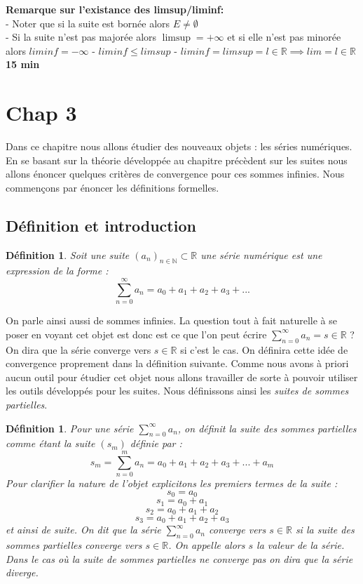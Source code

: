 \documentclass[a4paper, 12pt, french, twoside]{article}
\newtheorem{defi}[theorem]{Définition}
\newcommand{\Nn}{{\mathbb{N}}}
\newcommand{\Rr}{{\mathbb{R}}}
\begin{document}
\textbf{Remarque sur l'existance des limsup/liminf:} \\  
- Noter que si la suite est bornée alors $E \neq \emptyset$ \\ 
- Si la suite n'est pas majorée alors $\limsup = + \infty$ et si elle n'est pas minorée alors $liminf = -\infty$
- $liminf \le limsup$
- $liminf = limsup = l \in \Rr \implies lim = l \in \Rr $
\\

\textbf{15 min}

\section{Chap 3}
Dans ce chapitre nous allons étudier des nouveaux objets : les séries numériques. En se basant sur la théorie développée au chapitre précèdent sur les suites nous allons énoncer quelques critères de convergence pour ces sommes infinies. Nous commençons par énoncer les définitions formelles. 
\subsection{Définition et introduction}
\begin{defi}
    Soit une suite $(a_n)_{n \in \Nn } \subset \Rr$ une série numérique est une expression de la forme : 
    $$ \sum_{n=0}^{\infty} a_n = a_0 + a_1 + a_2 + a_3 + ... $$
 \end{defi}    
On parle ainsi aussi de sommes infinies. La question tout à fait naturelle à se poser en voyant cet objet est donc est ce que l'on peut écrire $\sum_{n=0}^{\infty} a_n = s \in \Rr $ ? On dira que la série converge vers $s \in \Rr$ si c'est le cas. On définira cette idée de convergence proprement dans la définition suivante.
\newline 
Comme nous avons à priori aucun outil pour étudier cet objet nous allons travailler de sorte à pouvoir utiliser les outils développés pour les suites. Nous définissons ainsi les \textit{suites de sommes partielles}. 
\begin{defi}
    Pour une série  $ \sum_{n=0}^{\infty} a_n$, on définit la suite des sommes partielles comme étant la suite $(s_m)$ définie par : $$ s_m = \sum_{n=0}^m  a_n = a_0 + a_1 + a_2 + a_3 + ... + a_m $$
    Pour clarifier la nature de l'objet explicitons les premiers termes de la suite :
    $$ s_0 = a_0$$
    $$ s_1 = a_0 + a_1$$
    $$ s_2 = a_0 + a_1 + a_2$$
    $$ s_3 = a_0 + a_1 + a_2 + a_3$$
    et ainsi de suite.
    On dit que la série  $ \sum_{n=0}^{\infty} a_n$ converge vers  $ s\in \Rr$ si la suite des sommes partielles converge vers $s \in \Rr$. On appelle alors $s$ la valeur de la série. Dans le cas où la suite de sommes partielles ne converge pas on dira que la série diverge. 
\end{defi}
\end{document}
